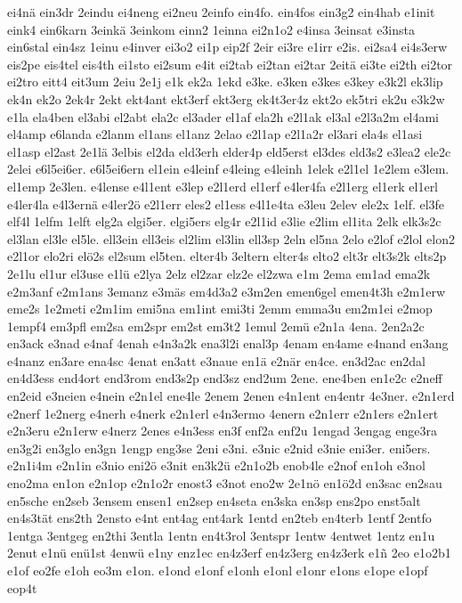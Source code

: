 {ei4nä
ein3dr
2eindu
ei4neng
ei2neu
2einfo
ein4fo.
ein4fos
ein3g2
ein4hab
e1init
eink4
ein6karn
3einkä
3einkom
einn2
1einna
ei2n1o2
e4insa
3einsat
e3insta
ein6stal
ein4sz
1einu
e4inver
ei3o2
ei1p
eip2f
2eir
ei3re
e1irr
e2is.
ei2sa4
ei4s3erw
eis2pe
eis4tel
eis4th
ei1sto
ei2sum
e4it
ei2tab
ei2tan
ei2tar
2eitä
ei3te
ei2th
ei2tor
ei2tro
eitt4
eit3um
2eiu
2e1j
e1k
ek2a
1ekd
e3ke.
e3ken
e3kes
e3key
e3k2l
ek3lip
ek4n
ek2o
2ek4r
2ekt
ekt4ant
ekt3erf
ekt3erg
ek4t3er4z
ekt2o
ek5tri
ek2u
e3k2w
e1la
ela4ben
el3abi
el2abt
ela2c
el3ader
el1af
ela2h
e2l1ak
el3al
e2l3a2m
el4ami
el4amp
e6landa
e2lanm
el1ans
el1anz
2elao
e2l1ap
e2l1a2r
el3ari
ela4s
el1asi
el1asp
el2ast
2e1lä
3elbis
el2da
eld3erh
elder4p
eld5erst
el3des
eld3s2
e3lea2
ele2c
2elei
e6l5ei6er.
e6l5ei6ern
el1ein
e4leinf
e4leing
e4leinh
1elek
e2l1el
1e2lem
e3lem.
el1emp
2e3len.
e4lense
e4l1ent
e3lep
e2l1erd
el1erf
e4ler4fa
e2l1erg
el1erk
el1erl
e4ler4la
e4l3ernä
e4ler2ö
e2l1err
eles2
el1ess
e4l1e4ta
e3leu
2elev
ele2x
1elf.
el3fe
elf4l
1elfm
1elft
elg2a
elgi5er.
elgi5ers
elg4r
e2l1id
e3lie
e2lim
el1ita
2elk
elk3s2c
el3lan
el3le
el5le.
ell3ein
ell3eis
el2lim
el3lin
ell3sp
2eln
el5na
2elo
e2lof
e2lol
elon2
e2l1or
elo2ri
elö2s
el2sum
el5ten.
elter4b
3eltern
elter4s
elto2
elt3r
elt3s2k
elts2p
2e1lu
el1ur
el3use
e1lü
e2lya
2elz
el2zar
elz2e
el2zwa
e1m
2ema
em1ad
ema2k
e2m3anf
e2m1ans
3emanz
e3mäs
em4d3a2
e3m2en
emen6gel
emen4t3h
e2m1erw
eme2s
1e2meti
e2m1im
emi5na
em1int
emi3ti
2emm
emma3u
em2m1ei
e2mop
1empf4
em3pfl
em2sa
em2spr
em2st
em3t2
1emul
2emü
e2n1a
4ena.
2en2a2c
en3ack
e3nad
e4naf
4enah
e4n3a2k
ena3l2i
enal3p
4enam
en4ame
e4nand
en3ang
e4nanz
en3are
ena4sc
4enat
en3att
e3naue
en1ä
e2när
en4ce.
en3d2ac
en2dal
en4d3ess
end4ort
end3rom
end3s2p
end3sz
end2um
2ene.
ene4ben
en1e2c
e2neff
en2eid
e3neien
e4nein
e2n1el
ene4le
2enem
2enen
e4n1ent
en4entr
4e3ner.
e2n1erd
e2nerf
1e2nerg
e4nerh
e4nerk
e2n1erl
e4n3ermo
4enern
e2n1err
e2n1ers
e2n1ert
e2n3eru
e2n1erw
e4nerz
2enes
e4n3ess
en3f
enf2a
enf2u
1engad
3engag
enge3ra
en3g2i
en3glo
en3gn
1engp
eng3se
2eni
e3ni.
e3nic
e2nid
e3nie
eni3er.
eni5ers.
e2n1i4m
e2n1in
e3nio
eni2ö
e3nit
en3k2ü
e2n1o2b
enob4le
e2nof
en1oh
e3nol
eno2ma
en1on
e2n1op
e2n1o2r
enost3
e3not
eno2w
2e1nö
en1ö2d
en3sac
en2sau
en5sche
en2seb
3ensem
ensen1
en2sep
en4seta
en3ska
en3sp
ens2po
enst5alt
en4s3tät
ens2th
2ensto
e4nt
ent4ag
ent4ark
1entd
en2teb
en4terb
1entf
2entfo
1entga
3entgeg
en2thi
3entla
1entn
en4t3rol
3entspr
1entw
4entwet
1entz
en1u
2enut
e1nü
enü1st
4enwü
e1ny
enz1ec
en4z3erf
en4z3erg
en4z3erk
e1ñ
2eo
e1o2b1
e1of
eo2fe
e1oh
eo3m
e1on.
e1ond
e1onf
e1onh
e1onl
e1onr
e1ons
e1ope
e1opf
eop4t
}
